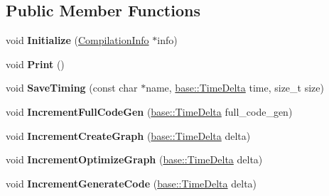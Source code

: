 \subsection*{Public Member Functions}
\begin{DoxyCompactItemize}
\item 
void {\bfseries Initialize} (\hyperlink{classv8_1_1internal_1_1_compilation_info}{Compilation\+Info} $\ast$info)\hypertarget{classv8_1_1internal_1_1_h_statistics_a412e55cb0ce20181cccfacdcd682e947}{}\label{classv8_1_1internal_1_1_h_statistics_a412e55cb0ce20181cccfacdcd682e947}

\item 
void {\bfseries Print} ()\hypertarget{classv8_1_1internal_1_1_h_statistics_a3d35cf669eda9b99a2973288080b15b2}{}\label{classv8_1_1internal_1_1_h_statistics_a3d35cf669eda9b99a2973288080b15b2}

\item 
void {\bfseries Save\+Timing} (const char $\ast$name, \hyperlink{classv8_1_1base_1_1_time_delta}{base\+::\+Time\+Delta} time, size\+\_\+t size)\hypertarget{classv8_1_1internal_1_1_h_statistics_a65d0d88d5b798b6e2acd296a15827780}{}\label{classv8_1_1internal_1_1_h_statistics_a65d0d88d5b798b6e2acd296a15827780}

\item 
void {\bfseries Increment\+Full\+Code\+Gen} (\hyperlink{classv8_1_1base_1_1_time_delta}{base\+::\+Time\+Delta} full\+\_\+code\+\_\+gen)\hypertarget{classv8_1_1internal_1_1_h_statistics_aa20cacac7b7093d6daea6548ffd7f49a}{}\label{classv8_1_1internal_1_1_h_statistics_aa20cacac7b7093d6daea6548ffd7f49a}

\item 
void {\bfseries Increment\+Create\+Graph} (\hyperlink{classv8_1_1base_1_1_time_delta}{base\+::\+Time\+Delta} delta)\hypertarget{classv8_1_1internal_1_1_h_statistics_ada2128fab740ad7e9f00d8b7de57c02d}{}\label{classv8_1_1internal_1_1_h_statistics_ada2128fab740ad7e9f00d8b7de57c02d}

\item 
void {\bfseries Increment\+Optimize\+Graph} (\hyperlink{classv8_1_1base_1_1_time_delta}{base\+::\+Time\+Delta} delta)\hypertarget{classv8_1_1internal_1_1_h_statistics_ad4d9360b29335b7c4429142197fe9d89}{}\label{classv8_1_1internal_1_1_h_statistics_ad4d9360b29335b7c4429142197fe9d89}

\item 
void {\bfseries Increment\+Generate\+Code} (\hyperlink{classv8_1_1base_1_1_time_delta}{base\+::\+Time\+Delta} delta)\hypertarget{classv8_1_1internal_1_1_h_statistics_a9267ce7840aa29d3c55558531c5b643b}{}\label{classv8_1_1internal_1_1_h_statistics_a9267ce7840aa29d3c55558531c5b643b}


\end{DoxyCompactItemize}
